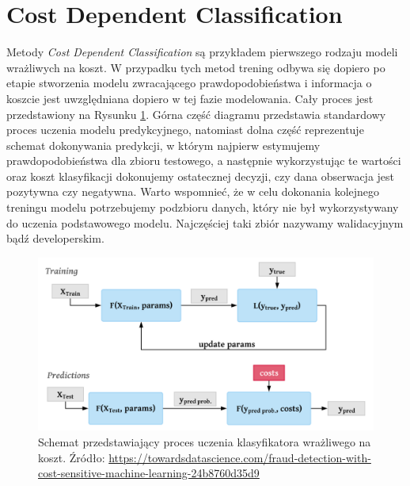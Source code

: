 \documentclass[inzynierska]{pwr_wmat_praca_dyplomowa}
\theoremstyle{plain}
\numberwithin{theorem}{chapter}
\theoremstyle{definition}
\numberwithin{theorem}{chapter}
\begin{document}

\section{Cost Dependent Classification}
Metody \textit{Cost Dependent Classification} są przykładem pierwszego rodzaju modeli wrażliwych na koszt. W przypadku tych metod trening odbywa się dopiero po etapie stworzenia modelu zwracającego prawdopodobieństwa i informacja o koszcie jest uwzględniana dopiero w tej fazie modelowania. Cały proces jest przedstawiony na Rysunku \ref{cdc}. Górna część diagramu przedstawia standardowy proces uczenia modelu predykcyjnego, natomiast dolna część reprezentuje schemat dokonywania predykcji, w którym najpierw estymujemy prawdopodobieństwa dla zbioru testowego, a następnie wykorzystując te wartości oraz koszt klasyfikacji dokonujemy ostatecznej decyzji, czy dana obserwacja jest pozytywna czy negatywna. Warto wspomnieć, że w celu dokonania kolejnego treningu modelu potrzebujemy podzbioru danych, który nie był wykorzystywany do uczenia podstawowego modelu. Najczęściej taki zbiór nazywamy walidacyjnym bądź developerskim. 
\begin{figure}
	\includegraphics[width=\linewidth]{images/cost_sensitive_classification.png}
	\caption{Schemat przedstawiający proces uczenia klasyfikatora wrażliwego na koszt. Źródło: \url{https://towardsdatascience.com/fraud-detection-with-cost-sensitive-machine-learning-24b8760d35d9}}
	\label{cdc}
\end{figure}
\end{document}
